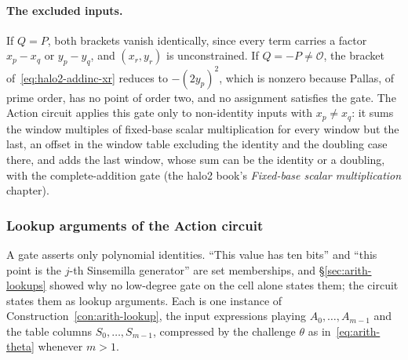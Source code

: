 \documentclass[11pt,a4paper]{article}
\theoremstyle{definition}
\begin{document}
\paragraph{The excluded inputs.}
If $Q = P$, both brackets vanish identically, since every term carries a
factor $x_p - x_q$ or $y_p - y_q$, and $(x_r, y_r)$ is unconstrained. If
$Q = -P \ne \mathcal O$, the bracket of~\eqref{eq:halo2-addinc-xr} reduces
to $-(2y_p)^2$, which is nonzero because Pallas, of prime order, has no
point of order two, and no assignment satisfies the gate. The Action
circuit applies this gate only to non-identity inputs with
$x_p \ne x_q$: it sums the window multiples of fixed-base scalar
multiplication for every window but the last, an offset in the window
table excluding the identity and the doubling case there, and adds the
last window, whose sum can be the identity or a doubling, with the
complete-addition gate (the halo2 book's \emph{Fixed-base scalar
multiplication} chapter).

\subsubsection{Lookup arguments of the Action circuit}
\label{sec:halo2-lookups}

A gate asserts only polynomial identities. ``This value has ten bits'' and
``this point is the $j$-th Sinsemilla generator'' are set memberships, and
\S\ref{sec:arith-lookups} showed why no low-degree gate on the cell alone states
them; the circuit states them as lookup arguments. Each is one instance of
Construction~\ref{con:arith-lookup}, the input expressions playing $A_0, \dots,
A_{m-1}$ and the table columns $S_0, \dots, S_{m-1}$, compressed by the
challenge $\theta$ as in~\eqref{eq:arith-theta} whenever $m > 1$.
\end{document}
